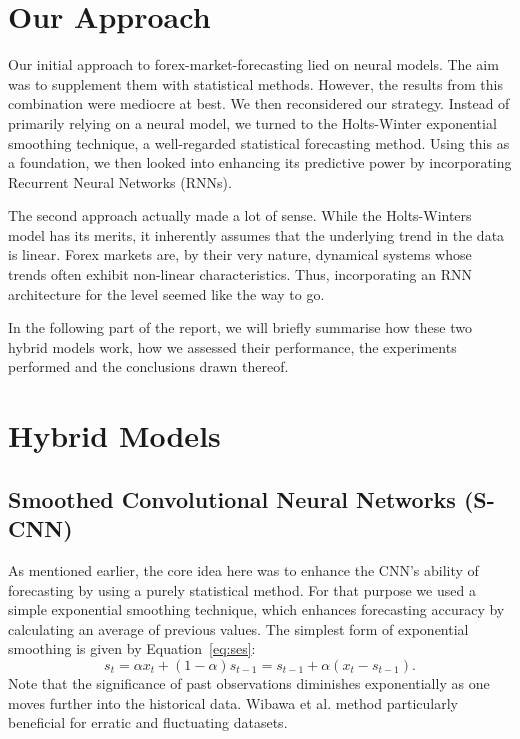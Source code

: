 \documentclass[conference]{IEEEtran}
\begin{document}
\section{Our Approach}

Our initial approach to forex-market-forecasting lied on neural models. The  aim was to supplement them with statistical methods. However, the results from this combination were mediocre at best. We then reconsidered our strategy. Instead of primarily relying on a neural model, we turned to the Holts-Winter exponential smoothing technique\cite{winters}, a well-regarded statistical forecasting method. Using this as a foundation, we then looked into enhancing its predictive power by incorporating Recurrent Neural Networks (RNNs).

The second approach actually made a lot of sense. While the Holts-Winters model has its merits, it inherently assumes that the underlying trend in the data is linear\cite{winters}. Forex markets are, by their very nature, dynamical systems whose trends often exhibit non-linear characteristics\cite{ayitey}. Thus, incorporating an RNN architecture for the level seemed like the way to go.

In the following part of the report, we will briefly summarise how these two hybrid models work, how we assessed their performance, the experiments performed and the conclusions drawn thereof.

\section{Hybrid Models}

\subsection{Smoothed Convolutional Neural Networks (S-CNN)}

As mentioned earlier, the core idea here was to enhance the CNN's ability of forecasting by using a purely statistical method. For that purpose we used a simple exponential smoothing technique, which enhances forecasting accuracy\cite{e-cnn} by calculating an average of previous values. The simplest form of exponential smoothing is given by Equation~\ref{eq:ses}:
\begin{equation}
\displaystyle s_{t}=\alpha x_{t}+(1-\alpha )s_{t-1}=s_{t-1}+\alpha (x_{t}-s_{t-1}) .\label{eq:ses}
\end{equation}
Note that the significance of past observations diminishes exponentially as one moves further into the historical data. Wibawa et al.\cite{e-cnn} method  particularly beneficial for erratic and fluctuating datasets.
\end{document}
